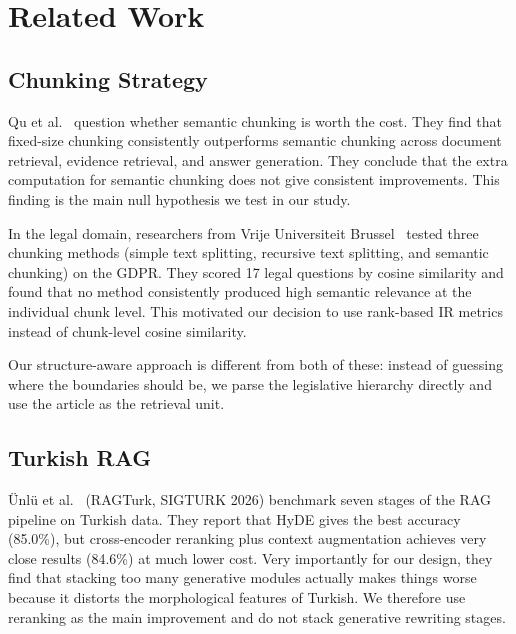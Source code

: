 \documentclass[11pt,a4paper,twocolumn]{article}
\begin{document}
\section{Related Work}
\label{sec:related}

\subsection{Chunking Strategy}

Qu et al.~\cite{qu2025} question whether semantic chunking is worth the cost. They find that fixed-size chunking consistently outperforms semantic chunking across document retrieval, evidence retrieval, and answer generation. They conclude that the extra computation for semantic chunking does not give consistent improvements. This finding is the main null hypothesis we test in our study.

In the legal domain, researchers from Vrije Universiteit Brussel~\cite{jurix2024} tested three chunking methods (simple text splitting, recursive text splitting, and semantic chunking) on the GDPR. They scored 17 legal questions by cosine similarity and found that no method consistently produced high semantic relevance at the individual chunk level. This motivated our decision to use rank-based IR metrics instead of chunk-level cosine similarity.

Our structure-aware approach is different from both of these: instead of guessing where the boundaries should be, we parse the legislative hierarchy directly and use the article as the retrieval unit.

\subsection{Turkish RAG}

Ünlü et al.~\cite{ragturk2026} (RAGTurk, SIGTURK 2026) benchmark seven stages of the RAG pipeline on Turkish data. They report that HyDE gives the best accuracy (85.0\%), but cross-encoder reranking plus context augmentation achieves very close results (84.6\%) at much lower cost. Very importantly for our design, they find that stacking too many generative modules actually makes things worse because it distorts the morphological features of Turkish. We therefore use reranking as the main improvement and do not stack generative rewriting stages.
\end{document}
